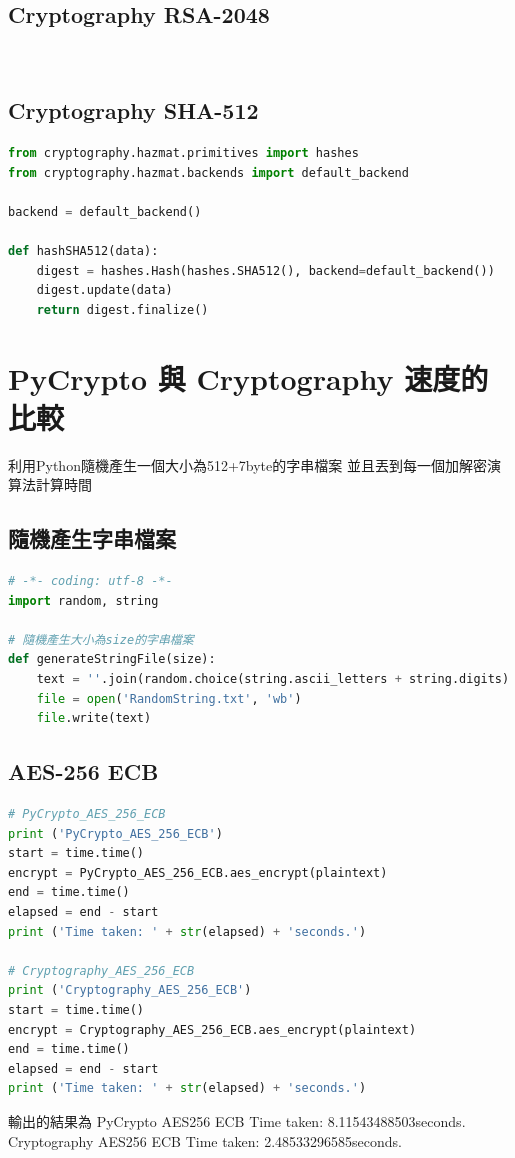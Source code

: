 \documentclass[12pt,a4paper]{article}
\begin{document}
\subsection{Cryptography RSA-2048}
{
\begin{lstlisting}[language=Python]
	
\end{lstlisting}
}

\subsection{Cryptography SHA-512}
{
\begin{lstlisting}[language=Python]
from cryptography.hazmat.primitives import hashes
from cryptography.hazmat.backends import default_backend

backend = default_backend()

def hashSHA512(data):
    digest = hashes.Hash(hashes.SHA512(), backend=default_backend())
    digest.update(data)
    return digest.finalize()
\end{lstlisting}
}

\newpage %
\section{PyCrypto 與 Cryptography 速度的比較}
利用Python隨機產生一個大小為512+7byte的字串檔案
並且丟到每一個加解密演算法計算時間
\subsection{隨機產生字串檔案}
{
\begin{lstlisting}[language=Python]
# -*- coding: utf-8 -*-
import random, string

# 隨機產生大小為size的字串檔案
def generateStringFile(size):
    text = ''.join(random.choice(string.ascii_letters + string.digits) for x in range(size))
    file = open('RandomString.txt', 'wb')
    file.write(text)
\end{lstlisting}
}

\subsection{AES-256 ECB}
{
\begin{lstlisting}[language=Python]
# PyCrypto_AES_256_ECB
print ('PyCrypto_AES_256_ECB')
start = time.time()
encrypt = PyCrypto_AES_256_ECB.aes_encrypt(plaintext)
end = time.time()
elapsed = end - start
print ('Time taken: ' + str(elapsed) + 'seconds.')

# Cryptography_AES_256_ECB
print ('Cryptography_AES_256_ECB')
start = time.time()
encrypt = Cryptography_AES_256_ECB.aes_encrypt(plaintext)
end = time.time()
elapsed = end - start
print ('Time taken: ' + str(elapsed) + 'seconds.')
\end{lstlisting}
輸出的結果為
\newline PyCrypto AES256 ECB
Time taken: 8.11543488503seconds.
\newline Cryptography AES256 ECB
Time taken: 2.48533296585seconds.
}
\end{document}
